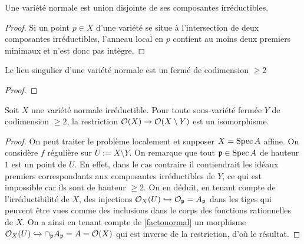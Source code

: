 \begin{prop}\label{normaluniondisjointe}
Une variété normale est union disjointe de ses composantes irréductibles.
\end{prop}
\begin{proof}
Si un point $p\in X$ d'une variété se situe à l'intersection de deux composantes irréductibles, l'anneau local en $p$ contient au moins deux premiers minimaux et n'est donc pas intègre.
\end{proof}

\begin{prop}\label{codimesingnormal}
Le lieu singulier d'une variété normale est un fermé de codimension $\geq 2$
\end{prop}
\begin{proof}

\end{proof}


\begin{prop}\label{extregularnormal}
Soit $X$ une variété normale irréductible. Pour toute sous-variété fermée $Y$ de codimension $\geq 2$, la restriction $\mathcal{O}(X)\rightarrow \mathcal{O}(X\setminus Y)$ est un isomorphisme.
\end{prop}
\begin{proof}
On peut traiter le problème localement et supposer $X=\operatorname{Spec} A$ affine. On considère $f$ régulière sur $U:=X\setminus Y$. On remarque que tout $\mathfrak{p}\in \operatorname{Spec} A$ de hauteur $1$ est un point de $U$. En effet, dans le cas contraire il contiendrait les idéaux premiers correspondants aux composantes irréductibles de $Y$, ce qui est impossible car ils sont de hauteur $\geq 2$. On en déduit, en tenant compte de l'irréductibilité de $X$, des injections $\mathcal{O}_X(U)\xhookrightarrow{} \mathcal{O}_\mathfrak{p}=A_\mathfrak{p}$ dans les tiges qui peuvent être vues comme des inclusions dans le corps des fonctions rationnelles de $X$. On a ainsi en tenant compte de \ref{factonormal} un morphisme $\mathcal{O}_X(U)\xhookrightarrow{} \cap_\mathfrak{p} A_\mathfrak{p}=A=\mathcal{O}(X)$ qui est inverse de la restriction, d'où le résultat.
\end{proof}

